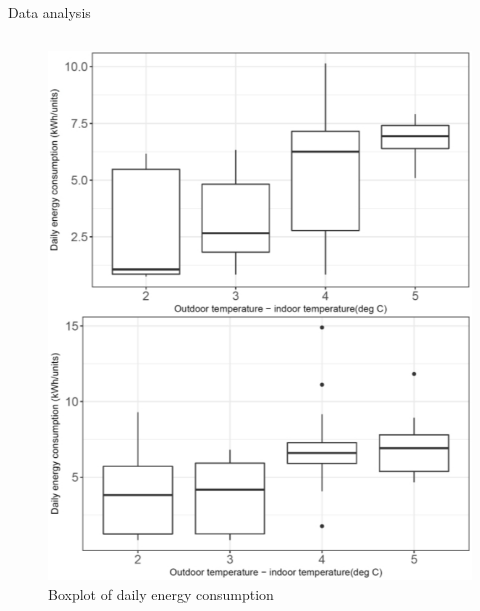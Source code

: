 \documentclass[aspectratio=169]{beamer}
\begin{document}
\begin{frame}{Data analysis}
\begin{columns}
\begin{figure}
                \includegraphics[scale=0.25]{pic/daily_boxplot.png}
                \caption{\footnotesize{Boxplot of daily energy consumption}}
            \end{figure}
    \end{columns}
\end{frame}
\end{document}
